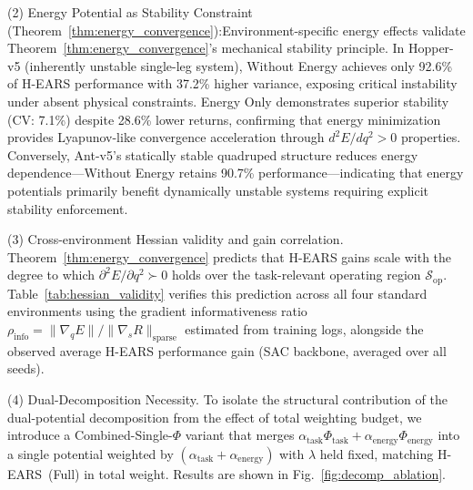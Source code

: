 \documentclass[journal]{IEEEtran}
\begin{document}
	(2) Energy Potential as Stability Constraint (Theorem~\ref{thm:energy_convergence}):Environment-specific energy effects validate Theorem~\ref{thm:energy_convergence}'s mechanical stability principle. In Hopper-v5 (inherently unstable single-leg system), Without Energy achieves only 92.6\% of H-EARS performance with 37.2\% higher variance, exposing critical instability under absent physical constraints. Energy Only demonstrates superior stability (CV: 7.1\%) despite 28.6\% lower returns, confirming that energy minimization provides Lyapunov-like convergence acceleration through $d^2E/dq^2 > 0$ properties. Conversely, Ant-v5's statically stable quadruped structure reduces energy dependence—Without Energy retains 90.7\% performance—indicating that energy potentials primarily benefit dynamically unstable systems requiring explicit stability enforcement.
	
	(3) Cross-environment Hessian validity and gain correlation. Theorem~\ref{thm:energy_convergence} predicts that H-EARS gains scale with the degree to which $\partial^2 E/\partial q^2 \succ 0$ holds over the task-relevant operating region $\mathcal{S}_{\text{op}}$. Table~\ref{tab:hessian_validity} verifies this prediction across all four standard environments using the gradient informativeness ratio $\rho_{\text{info}} = \|\nabla_q E\| / \|\nabla_s R\|_{\text{sparse}}$ estimated from training logs, alongside the observed average H-EARS performance gain (SAC backbone, averaged over all seeds).
	
	(4) Dual-Decomposition Necessity. To isolate the structural contribution of the dual-potential decomposition from the effect of total weighting budget, we introduce a Combined-Single-$\Phi$ variant that merges $\alpha_{\text{task}}\Phi_{\text{task}}+\alpha_{\text{energy}}\Phi_{\text{energy}}$ into a single potential weighted by $(\alpha_{\text{task}}+\alpha_{\text{energy}})$ with $\lambda$ held fixed, matching H-EARS~(Full) in total weight. Results are shown in Fig.~\ref{fig:decomp_ablation}.
	
\end{document}
